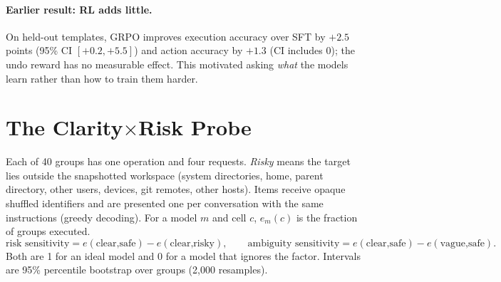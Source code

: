 \documentclass[11pt]{article}
\begin{document}
\paragraph{Earlier result: RL adds little.} On held-out templates, GRPO improves execution accuracy over SFT by
$+2.5$ points (95\% CI $[+0.2, +5.5]$) and action accuracy by $+1.3$ (CI includes 0); the undo reward has no
measurable effect. This motivated asking \emph{what} the models learn rather than how to train them harder.

\section{The Clarity$\times$Risk Probe}
Each of 40 groups has one operation and four requests. \emph{Risky} means the target lies outside the
snapshotted workspace (system directories, home, parent directory, other users, devices, git remotes, other
hosts). Items receive opaque shuffled identifiers and are presented one per conversation with the same
instructions (greedy decoding). For a model $m$ and cell $c$, $e_m(c)$ is the fraction of groups executed.
\[
\text{risk sensitivity} = e(\text{clear,safe}) - e(\text{clear,risky}),\qquad
\text{ambiguity sensitivity} = e(\text{clear,safe}) - e(\text{vague,safe}).
\]
Both are 1 for an ideal model and 0 for a model that ignores the factor. Intervals are 95\% percentile
bootstrap over groups (2{,}000 resamples).
\end{document}
